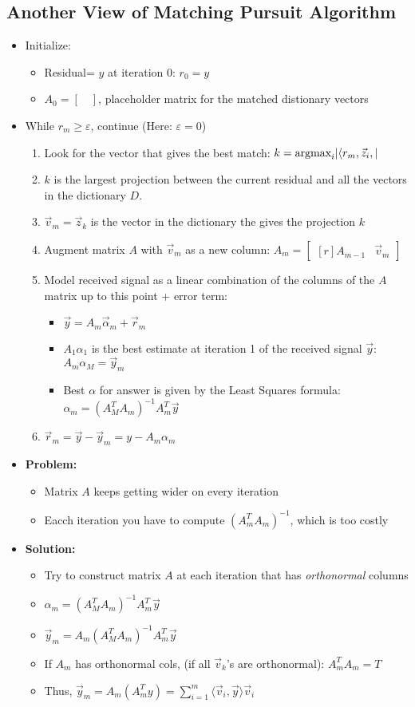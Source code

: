 \documentclass{article}\usepackage{amsmath,amssymb,amsthm,tikz,tkz-graph,color,chngpage,soul,hyperref,csquotes,graphicx,floatrow,framed,scrextend,mathtools,mathrsfs}\newcommand*{\QEDB}{\hfill\ensuremath{\square}}\newtheorem*{prop}{Proposition}\renewcommand{\theenumi}{\alph{enumi}}\usepackage[shortlabels]{enumitem}\usepackage[nobreak=true]{mdframed}\usetikzlibrary{matrix,calc}\MakeOuterQuote{"}\usepackage[margin=0.75in]{geometry} \newtheorem{theorem}{Theorem}\newcommand{\Z}{\mathbb Z}\newcommand{\R}{\mathbb R}\newcommand{\Q}{\mathbb Q}\newcommand{\N}{\mathbb N}\newcommand{\x}[1]{\textrm{#1}}\newcommand{\xs}[1]{\textrm{ #1 }}\newcommand{\pr}{\textrm{Pr}}
\newcommand{\sumlim}[3]{\sum\limits_{#1}^{#2}#3}
\newcommand{\inprod}[2]{\langle #1, #2\rangle}
\DeclarePairedDelimiter{\abs}{\lvert}{\rvert}
\newcommand{\items}[1]{\begin{itemize}#1\end{itemize}}
\newcommand{\bmat}[1]{\begin{bmatrix*}[r]#1\end{bmatrix*}}
\newcommand{\e}{\varepsilon}
\begin{document}
\subsection*{Another View of Matching Pursuit Algorithm}
\items{
    \item Initialize: 
    \items{
        \item Residual= $y$ at iteration 0: $r_0=y$
        \item $A_0=[\quad]$, placeholder matrix for the matched distionary vectors
    }
    \item While $r_m\ge\e$, continue (Here: $\e=0$)
    \begin{enumerate}[1.]
        \item Look for the vector that gives the best match: $k=\x{argmax}_i\abs{\inprod{r_m,\vec{z}_i}}$
        \item $k$ is the largest projection between the current residual and all the vectors in the dictionary $D$.
        \item $\vec{v}_m=\vec{z}_k$ is the vector in the dictionary the gives the projection $k$
        \item Augment matrix $A$ with $\vec{v}_m$ as a new column: $A_m=\bmat{A_{m-1}&\vec{v}_m}$
        \item Model received signal as a linear combination of the columns of the $A$ matrix up to this point  + error term:
        \items{
            \item $\vec{y}=A_m\vec{\alpha}_m+\vec{r}_m$
            \item $A_1\alpha_1$ is the best estimate at iteration 1 of the received signal $\vec{y}$: $A_m\alpha_M=\vec{y}_m$
            \item Best $\alpha$ for answer is given by the Least Squares formula: $\alpha_m=(A_M^TA_m)^{-1}A_m^T\vec{y}$
        }
        \item $\vec{r}_m=\vec{y}-\vec{y}_m=y-A_m\alpha_m$
    \end{enumerate}
    \item \textbf{Problem:}
    \items{
        \item Matrix $A$ keeps getting wider on every iteration
        \item Eacch iteration you have to compute $(A_m^TA_m)^{-1}$, which is too costly
    }
    \item \textbf{Solution:}
    \items{
        \item Try to construct matrix $A$ at each iteration that has \textit{orthonormal} columns
        \item $\alpha_m=(A_M^TA_m)^{-1}A_m^T\vec{y}$
        \item $\vec{y}_m=A_m(A_M^TA_m)^{-1}A_m^T\vec{y}$
        \item If $A_m$ has orthonormal cols, (if all $\vec{v}_k$'s are orthonormal): $A_m^TA_m=T$
        \item Thus, $\vec{y}_m=A_m(A_m^Ty)=\sumlim{i=1}{m}{\inprod{\vec{v}_i}{\vec{y}}\vec{v}_i}$
    }
}
\end{document}
